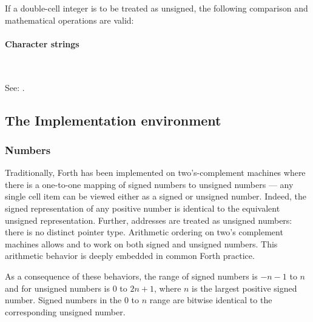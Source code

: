 \begin{quote}\ttfamily
					
				
			
			
\end{quote}

If a double-cell integer is to be treated as unsigned, the following
comparison and mathematical operations are valid:

\begin{quote}\ttfamily
		
			
\end{quote}


\paragraph{Character strings} ~ %

See: .


\subsection{The Implementation environment} %

\subsubsection{Numbers} %
\label{rat:env:num}

Traditionally, Forth has been implemented on two's-complement machines
where there is a one-to-one mapping of signed numbers to unsigned
numbers --- any single cell item can be viewed either as a signed or
unsigned number. Indeed, the signed representation of any positive
number is identical to the equivalent unsigned representation. Further,
addresses are treated as unsigned numbers: there is no distinct pointer
type. Arithmetic ordering on two's complement machines allows \word{+}
and \word{-} to work on both signed and unsigned numbers. This
arithmetic behavior is deeply embedded in common Forth practice.

As a consequence of these behaviors, the range of
signed numbers is $-n-1$ to $n$ and for unsigned numbers is $0$ to
$2n+1$, where $n$ is the largest positive signed number.
Signed numbers in the $0$ to $n$ range are bitwise identical to the
corresponding unsigned number.

\setcounter{paragraph}{1}
